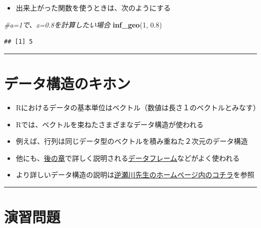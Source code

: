 \documentclass[
]{book}
\newenvironment{Shaded}{\begin{snugshade}}{\end{snugshade}}
\newcommand{\CommentTok}[1]{\textcolor[rgb]{0.56,0.35,0.01}{\textit{#1}}}
\newcommand{\DecValTok}[1]{\textcolor[rgb]{0.00,0.00,0.81}{#1}}
\newcommand{\FloatTok}[1]{\textcolor[rgb]{0.00,0.00,0.81}{#1}}
\newcommand{\FunctionTok}[1]{\textcolor[rgb]{0.13,0.29,0.53}{\textbf{#1}}}
\newcommand{\NormalTok}[1]{#1}
\providecommand{\tightlist}{%
  \setlength{\itemsep}{0pt}\setlength{\parskip}{0pt}}
\begin{document}
\begin{itemize}
\tightlist
\item
  出来上がった関数を使うときは、次のようにする
\end{itemize}

\begin{Shaded}
\begin{Highlighting}[]
\CommentTok{\#a=1で、x=0.8を計算したい場合}
\FunctionTok{inf\_geo}\NormalTok{(}\DecValTok{1}\NormalTok{, }\FloatTok{0.8}\NormalTok{)}
\end{Highlighting}
\end{Shaded}

\begin{verbatim}
## [1] 5
\end{verbatim}

\begin{center}\rule{0.5\linewidth}{0.5pt}\end{center}

\hypertarget{ux30c7ux30fcux30bfux69cbux9020ux306eux30adux30dbux30f3}{%
\section{データ構造のキホン}\label{ux30c7ux30fcux30bfux69cbux9020ux306eux30adux30dbux30f3}}

\begin{itemize}
\tightlist
\item
  Rにおけるデータの基本単位はベクトル（数値は長さ１のベクトルとみなす）
\item
  Rでは、ベクトルを束ねたさまざまなデータ構造が使われる
\item
  例えば、行列は同じデータ型のベクトルを積み重ねた２次元のデータ構造
\item
  他にも、\protect\hyperlink{ux30c7ux30fcux30bfux30d5ux30ecux30fcux30e0}{後の章}で詳しく説明される\protect\hyperlink{ux30c7ux30fcux30bfux30d5ux30ecux30fcux30e0}{データフレーム}などがよく使われる
\item
  より詳しいデータ構造の説明は\href{http://www.f.waseda.jp/sakas/R/Rdata.html}{逆瀬川先生のホームページ内のコチラ}を参照
\end{itemize}

\begin{center}\rule{0.5\linewidth}{0.5pt}\end{center}

\hypertarget{ux6f14ux7fd2ux554fux984c-2}{%
\section{演習問題}\label{ux6f14ux7fd2ux554fux984c-2}}
\end{document}
